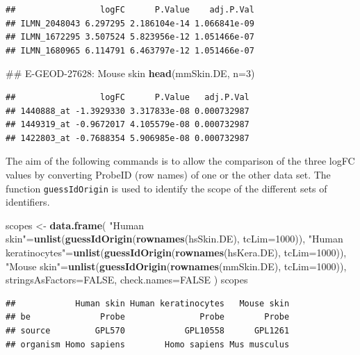 \documentclass[9pt,a4paper,]{extarticle}
\newenvironment{Shaded}{\begin{snugshade}}{\end{snugshade}}
\newcommand{\KeywordTok}[1]{\textcolor[rgb]{0.13,0.29,0.53}{\textbf{#1}}}
\newcommand{\DataTypeTok}[1]{\textcolor[rgb]{0.13,0.29,0.53}{#1}}
\newcommand{\DecValTok}[1]{\textcolor[rgb]{0.00,0.00,0.81}{#1}}
\newcommand{\StringTok}[1]{\textcolor[rgb]{0.31,0.60,0.02}{#1}}
\newcommand{\OtherTok}[1]{\textcolor[rgb]{0.56,0.35,0.01}{#1}}
\newcommand{\NormalTok}[1]{#1}
\theoremstyle{definition}
\theoremstyle{definition}
\theoremstyle{definition}
\theoremstyle{remark}
\begin{document}
\begin{verbatim}
##                 logFC      P.Value    adj.P.Val
## ILMN_2048043 6.297295 2.186104e-14 1.066841e-09
## ILMN_1672295 3.507524 5.823956e-12 1.051466e-07
## ILMN_1680965 6.114791 6.463797e-12 1.051466e-07
\end{verbatim}

\begin{Shaded}
\begin{Highlighting}[]
\NormalTok{## E-GEOD-27628: Mouse skin}
\KeywordTok{head}\NormalTok{(mmSkin.DE, }\DataTypeTok{n=}\DecValTok{3}\NormalTok{)}
\end{Highlighting}
\end{Shaded}

\begin{verbatim}
##                 logFC      P.Value   adj.P.Val
## 1440888_at -1.3929330 3.317833e-08 0.000732987
## 1449319_at -0.9672017 4.105579e-08 0.000732987
## 1422803_at -0.7688354 5.906985e-08 0.000732987
\end{verbatim}

The aim of the following commands is to allow the comparison of the three
logFC values by converting ProbeID (row names) of one or the other data set.
The function \texttt{guessIdOrigin} is used to identify the scope of the different
sets of identifiers.

\begin{Shaded}
\begin{Highlighting}[]
\NormalTok{scopes <-}\StringTok{ }\KeywordTok{data.frame}\NormalTok{(}
   \StringTok{"Human skin"}\NormalTok{=}\KeywordTok{unlist}\NormalTok{(}\KeywordTok{guessIdOrigin}\NormalTok{(}\KeywordTok{rownames}\NormalTok{(hsSkin.DE), }\DataTypeTok{tcLim=}\DecValTok{1000}\NormalTok{)),}
   \StringTok{"Human keratinocytes"}\NormalTok{=}\KeywordTok{unlist}\NormalTok{(}\KeywordTok{guessIdOrigin}\NormalTok{(}\KeywordTok{rownames}\NormalTok{(hsKera.DE), }\DataTypeTok{tcLim=}\DecValTok{1000}\NormalTok{)),}
   \StringTok{"Mouse skin"}\NormalTok{=}\KeywordTok{unlist}\NormalTok{(}\KeywordTok{guessIdOrigin}\NormalTok{(}\KeywordTok{rownames}\NormalTok{(mmSkin.DE), }\DataTypeTok{tcLim=}\DecValTok{1000}\NormalTok{)),}
   \DataTypeTok{stringsAsFactors=}\OtherTok{FALSE}\NormalTok{, }\DataTypeTok{check.names=}\OtherTok{FALSE}
\NormalTok{)}
\NormalTok{scopes}
\end{Highlighting}
\end{Shaded}

\begin{verbatim}
##            Human skin Human keratinocytes   Mouse skin
## be              Probe               Probe        Probe
## source         GPL570            GPL10558      GPL1261
## organism Homo sapiens        Homo sapiens Mus musculus
\end{verbatim}
\end{document}
